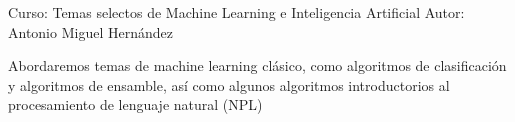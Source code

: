 Curso: Temas selectos de Machine Learning e Inteligencia Artificial
Autor: Antonio Miguel Hernández

Abordaremos temas de machine learning clásico, como algoritmos de clasificación y algoritmos de ensamble, así como algunos algoritmos introductorios al procesamiento de lenguaje natural (NPL)